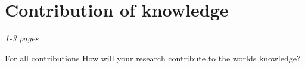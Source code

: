 \chapter{Contribution of knowledge}
\label{ch:contribution}
\textit{1-3 pages}

For all contributions
How will your research contribute to the worlds knowledge?
